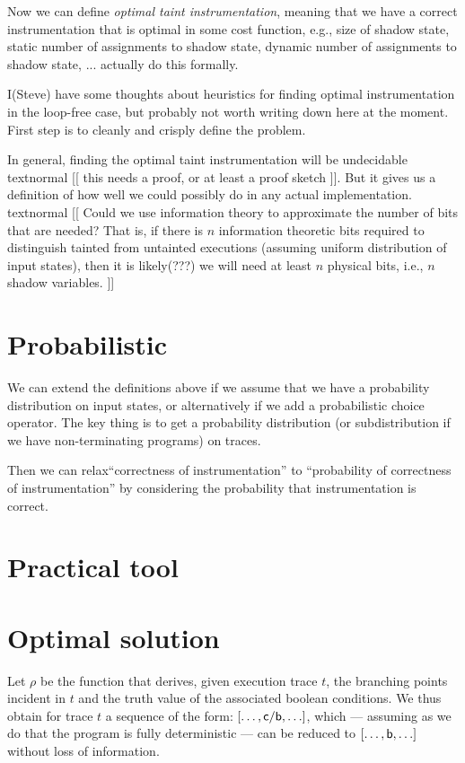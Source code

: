 \documentclass[]{article}
\newcommand{\todo}[1]{textnormal{{\color{black} [[ #1 ]]}}}
\begin{document}
{Now we can define \emph{optimal taint instrumentation}, meaning that
we have a correct instrumentation that is optimal in some cost
function, e.g., size of shadow state, static number of assignments to
shadow state, dynamic number of assignments to shadow state,
... actually do this formally.

I(Steve) have some thoughts about heuristics for finding optimal
instrumentation in the loop-free case, but probably not worth writing
down here at the moment. First step is to cleanly and crisply define
the problem.

In general, finding the optimal taint instrumentation will be
undecidable \todo{this needs a proof, or at least a proof sketch}. But
it gives us a definition of how well we could possibly do in any
actual implementation. \todo{Could we use information theory to
  approximate the number of bits that are needed? That is, if there is
$n$ information theoretic bits required to distinguish tainted from
untainted executions (assuming uniform distribution of input states), then it is likely(???) we will need at least $n$ physical bits, i.e., $n$
shadow variables.}


\section{Probabilistic}

We can extend the definitions above if we assume that we have a
probability distribution on input states, or alternatively if we add a
probabilistic choice operator. The key thing is to get a probability
distribution (or subdistribution if we have non-terminating programs)
on traces.

Then we can relax``correctness of instrumentation'' to ``probability of correctness of
instrumentation'' by considering the probability that instrumentation
is correct. 

\section{Practical tool}

\section{Optimal solution}

Let $\rho$ be the function that derives, given execution trace $t$, the branching points incident in $t$ and the truth value of the associated boolean conditions. We thus obtain for trace $t$ a sequence of the form: $[ \ldots , {\sf c}/{\sf b}, \ldots ]$, which --- assuming as we do that the program is fully deterministic --- can be reduced to $[ \ldots, {\sf b}, \ldots]$ without loss of information.

}
\end{document}
